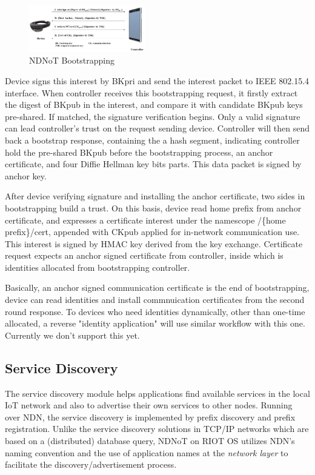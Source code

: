 \documentclass[sigconf]{acmart}
\begin{document}
\begin{figure}[h]
	\vspace{-0.1cm}
	\centering
	\includegraphics[width=0.45\textwidth]{figures/bootstrap}
	\caption{NDNoT Bootstrapping}
	\vspace{-0.1cm}
	\label{fig:bootstrap}
\end{figure}

Device signs this interest by BKpri and send the interest packet to IEEE 802.15.4 interface. When controller receives this bootstrapping request,
it firstly extract the digest of BKpub in the interest, and compare it with candidate BKpub keys pre-shared. If matched, the signature verification 
begins. Only a valid signature can lead controller's trust on the request sending device. Controller will then send back a bootstrap response, 
containing the a hash segment, indicating controller hold the pre-shared BKpub before the bootstrapping process, an anchor certificate, and four Diffie Hellman key 
bits parts. This data packet is signed by anchor key. 

After device verifying signature and installing the anchor certificate, two sides in bootstrapping build a trust. On this basis, device read home prefix from 
anchor certificate, and expresses a certificate interest under the namescope /\{home prefix\}/cert, appended with CKpub applied for in-network communication use. This interest 
is signed by HMAC key derived from the key exchange. Certificate request expects an anchor signed certificate from controller, inside which is identities allocated 
from bootstrapping controller. 

Basically, an anchor signed communication certificate is the end of bootstrapping, device can read identities and install commnuication certificates from the second round response. 
To devices who need identities dynamically, other than one-time allocated, a reverse "identity application" will use similar workflow with this one. Currently we don't support this yet.

\subsection{Service Discovery}

The service discovery module helps applications find available services in the local IoT network and also to advertise their own services to other nodes.
Running over NDN, the service discovery is implemented by prefix discovery and prefix registration.
Unlike the service discovery solutions in TCP/IP networks which are based on a (distributed) database query,
NDNoT on RIOT OS utilizes NDN's naming convention and the use of application names at the \emph{network layer} to facilitate the discovery/advertisement process.
\end{document}

